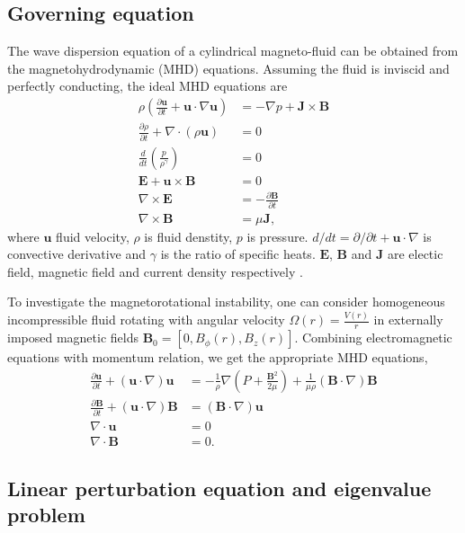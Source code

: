 \documentclass{jfm}
\newcommand{\del}{\nabla}
\begin{document}
%
%
\subsection{Governing equation}

The wave dispersion equation of a cylindrical magneto-fluid can be obtained 
from the magnetohydrodynamic (MHD) equations. Assuming the fluid is inviscid 
and perfectly conducting, the ideal MHD equations are 
\begin{align}
    \rho\left(\frac{\partial\mathbf{u}}{\partial t}+\mathbf{u}\cdot\del\mathbf{u}\right) &= -\del p +\mathbf{J}\times\mathbf{B} \\
    \frac{\partial \rho}{\partial t} + \del\cdot(\rho \mathbf{u})&=0 \\
    \frac{d}{dt}\left(\frac{p}{\rho^\gamma}\right)&=0\\
    \mathbf{E}+\mathbf{u}\times\mathbf{B}&=0 \\
    \del\times \mathbf{E} &= -\frac{\partial \mathbf{B}}{\partial t} \\
    \del \times \mathbf{B} &= \mu \mathbf{J},
\end{align}
where $\mathbf{u}$ fluid velocity, $\rho$ is fluid denstity, $p$ is pressure. $d/dt=\partial/\partial t +\mathbf{u}\cdot\del$ is convective derivative and $\gamma$ is the ratio of specific heats. $\mathbf{E}$, $\mathbf{B}$ and $\mathbf{J}$ are electic field, magnetic field and current density respectively \cite[see][]{Freidberg1987}.

To investigate the magnetorotational instability, one can consider homogeneous incompressible fluid rotating 
with angular velocity $\Omega(r)=\frac{V(r)}{r}$ in externally imposed magnetic 
fields $\mathbf{B}_0 = [0,B_\phi(r),B_z(r)]$. Combining electromagnetic 
equations with momentum relation, we get the appropriate MHD equations,
\begin{align}
    \frac{\partial \mathbf{u}}{\partial t}+(\mathbf{u}\cdot\del)\mathbf{u} &= -\frac{1}{\rho}\del\left(P+\frac{\mathbf{B}^2}{2\mu}\right)+\frac{1}{\mu\rho}(\mathbf{B}\cdot\del)\mathbf{B}\\
    \frac{\partial \mathbf{B}}{\partial t} +(\mathbf{u}\cdot\del)\mathbf{B} &=(\mathbf{B}\cdot\del)\mathbf{u} \\
    \del\cdot\mathbf{u}&=0\\
    \del \cdot \mathbf{B} &=0.
\end{align}


%
%
\subsection{Linear perturbation equation and eigenvalue problem}
\end{document}
